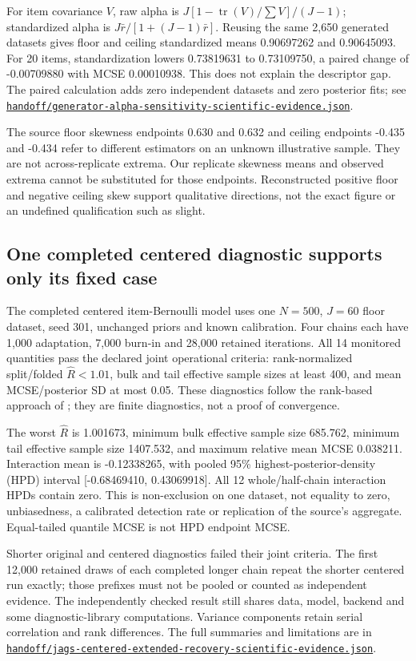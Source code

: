 \documentclass[11pt]{article}
\newcommand{\file}[1]{\href{https://github.com/alectionary/vibe-math/blob/master/formalization/schwabe-psychometric-genetics/#1}{\nolinkurl{#1}}}
\begin{document}
For item covariance $V$, raw alpha is $J[1-\operatorname{tr}(V)/\sum V]/(J-1)$; standardized alpha is $J\bar r/[1+(J-1)\bar r]$. Reusing the same 2,650 generated datasets gives floor and ceiling standardized means 0.90697262 and 0.90645093. For 20 items, standardization lowers 0.73819631 to 0.73109750, a paired change of -0.00709880 with MCSE 0.00010938. This does not explain the descriptor gap. The paired calculation adds zero independent datasets and zero posterior fits; see \file{handoff/generator-alpha-sensitivity-scientific-evidence.json}.

The source floor skewness endpoints 0.630 and 0.632 and ceiling endpoints -0.435 and -0.434 refer to different estimators on an unknown illustrative sample. They are not across-replicate extrema. Our replicate skewness means and observed extrema cannot be substituted for those endpoints. Reconstructed positive floor and negative ceiling skew support qualitative directions, not the exact figure or an undefined qualification such as slight.

\subsection{One completed centered diagnostic supports only its fixed case}
The completed centered item-Bernoulli model uses one $N=500$, $J=60$ floor dataset, seed 301, unchanged priors and known calibration. Four chains each have 1,000 adaptation, 7,000 burn-in and 28,000 retained iterations. All 14 monitored quantities pass the declared joint operational criteria: rank-normalized split/folded $\widehat R<1.01$, bulk and tail effective sample sizes at least 400, and mean MCSE/posterior SD at most 0.05. These diagnostics follow the rank-based approach of \citet{vehtari2021}; they are finite diagnostics, not a proof of convergence.

The worst $\widehat R$ is 1.001673, minimum bulk effective sample size 685.762, minimum tail effective sample size 1407.532, and maximum relative mean MCSE 0.038211. Interaction mean is -0.12338265, with pooled 95\% highest-posterior-density (HPD) interval [-0.68469410, 0.43069918]. All 12 whole/half-chain interaction HPDs contain zero. This is non-exclusion on one dataset, not equality to zero, unbiasedness, a calibrated detection rate or replication of the source's aggregate. Equal-tailed quantile MCSE is not HPD endpoint MCSE.

Shorter original and centered diagnostics failed their joint criteria. The first 12,000 retained draws of each completed longer chain repeat the shorter centered run exactly; those prefixes must not be pooled or counted as independent evidence. The independently checked result still shares data, model, backend and some diagnostic-library computations. Variance components retain serial correlation and rank differences. The full summaries and limitations are in \file{handoff/jags-centered-extended-recovery-scientific-evidence.json}.
\end{document}
